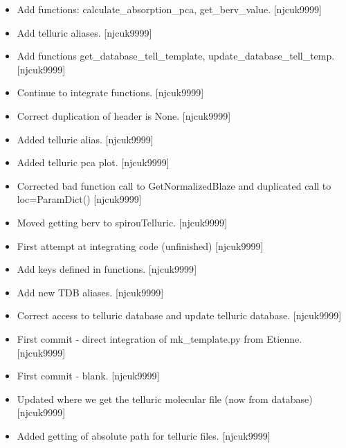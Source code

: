 \documentclass[a4paper,10pt,english]{report}
\begin{document}
\label{\detokenize{misc/changelog:id392}}\begin{itemize}
\item {} 
Add functions: calculate\_absorption\_pca, get\_berv\_value. {[}njcuk9999{]}

\item {} 
Add telluric aliases. {[}njcuk9999{]}

\item {} 
Add functions get\_database\_tell\_template, update\_database\_tell\_temp.
{[}njcuk9999{]}

\item {} 
Continue to integrate functions. {[}njcuk9999{]}

\item {} 
Correct duplication of header is None. {[}njcuk9999{]}

\item {} 
Added telluric alias. {[}njcuk9999{]}

\item {} 
Added telluric pca plot. {[}njcuk9999{]}

\item {} 
Corrected bad function call to GetNormalizedBlaze and duplicated call
to loc=ParamDict() {[}njcuk9999{]}

\item {} 
Moved getting berv to spirouTelluric. {[}njcuk9999{]}

\item {} 
First attempt at integrating code (unfinished) {[}njcuk9999{]}

\item {} 
Add keys defined in functions. {[}njcuk9999{]}

\item {} 
Add new TDB aliases. {[}njcuk9999{]}

\item {} 
Correct access to telluric database and update telluric database.
{[}njcuk9999{]}

\item {} 
First commit - direct integration of mk\_template.py from Etienne.
{[}njcuk9999{]}

\item {} 
First commit - blank. {[}njcuk9999{]}

\item {} 
Updated where we get the telluric molecular file (now from database)
{[}njcuk9999{]}

\item {} 
Added getting of absolute path for telluric files. {[}njcuk9999{]}


\end{itemize}
\end{document}
